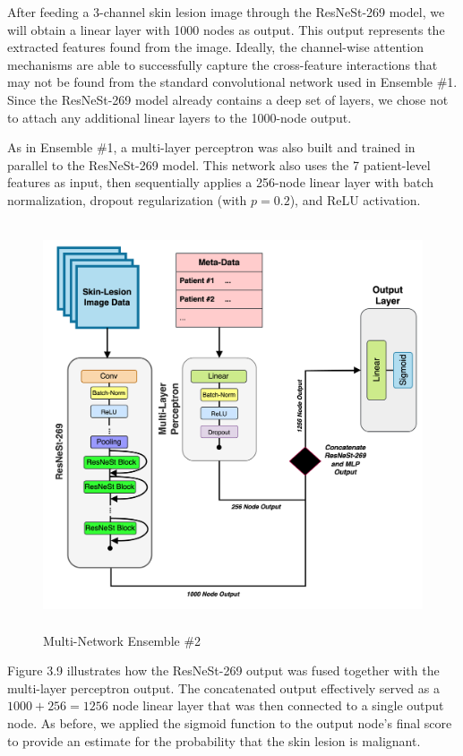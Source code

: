 \documentclass [MAS] {uclathes}
\begin{document}
After feeding a 3-channel skin lesion image through the ResNeSt-269 model, we will obtain a linear layer with 1000 nodes as output. This output represents the extracted features found from the image. Ideally, the channel-wise attention mechanisms are able to successfully capture the cross-feature interactions that may not be found from the standard convolutional network used in Ensemble \#1. Since the ResNeSt-269 model already contains a deep set of layers, we chose not to attach any additional linear layers to the 1000-node output.

As in Ensemble \#1,  a multi-layer perceptron was also built and trained in parallel to the ResNeSt-269 model. This network also uses the 7 patient-level features as input, then sequentially applies a 256-node linear layer with batch normalization, dropout regularization (with $p=0.2$), and ReLU activation.


\begin{figure}[h]
\centering
\includegraphics[height = 120mm, width= 140mm]{imgs/ens2_arch.png}
\caption{Multi-Network Ensemble \#2}
\label{fig:ens2_arch}
\end{figure}

Figure 3.9 illustrates how the ResNeSt-269 output was fused together with the multi-layer perceptron output. The concatenated output effectively served as a $1000+256 = 1256$ node linear layer that was then connected to a single output node. As before, we applied the sigmoid function to the output node's final score to provide an estimate for the probability that the skin lesion is malignant.
\end{document}
